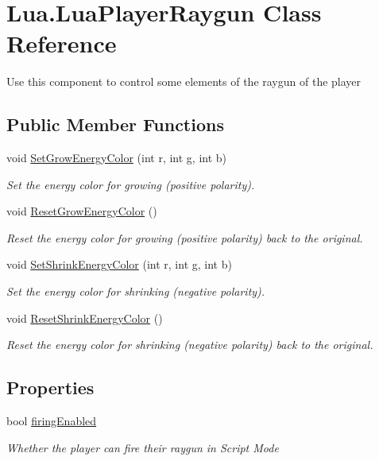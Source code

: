 \hypertarget{class_lua_1_1_lua_player_raygun}{}\section{Lua.\+Lua\+Player\+Raygun Class Reference}
\label{class_lua_1_1_lua_player_raygun}


Use this component to control some elements of the raygun of the player  


\subsection*{Public Member Functions}
\begin{DoxyCompactItemize}
\item 
void \mbox{\hyperlink{class_lua_1_1_lua_player_raygun_a6787608c1207618d069fba8aee7c8fff}{Set\+Grow\+Energy\+Color}} (int r, int g, int b)
\begin{DoxyCompactList}\small\item\em Set the energy color for growing (positive polarity). \end{DoxyCompactList}\item 
void \mbox{\hyperlink{class_lua_1_1_lua_player_raygun_aa7b98cc0da08ae879220e9729a47659e}{Reset\+Grow\+Energy\+Color}} ()
\begin{DoxyCompactList}\small\item\em Reset the energy color for growing (positive polarity) back to the original. \end{DoxyCompactList}\item 
void \mbox{\hyperlink{class_lua_1_1_lua_player_raygun_aad74166092a52e766a0296da4fabb98b}{Set\+Shrink\+Energy\+Color}} (int r, int g, int b)
\begin{DoxyCompactList}\small\item\em Set the energy color for shrinking (negative polarity). \end{DoxyCompactList}\item 
void \mbox{\hyperlink{class_lua_1_1_lua_player_raygun_a80852badcc3f3b0c14e73196b5299c37}{Reset\+Shrink\+Energy\+Color}} ()
\begin{DoxyCompactList}\small\item\em Reset the energy color for shrinking (negative polarity) back to the original. \end{DoxyCompactList}\end{DoxyCompactItemize}
\subsection*{Properties}
\begin{DoxyCompactItemize}
\item 
bool \mbox{\hyperlink{class_lua_1_1_lua_player_raygun_a002f731fc9b1c217a12b03045e87a0cd}{firing\+Enabled}}
\begin{DoxyCompactList}\small\item\em Whether the player can fire their raygun in Script Mode \end{DoxyCompactList}\end{DoxyCompactItemize}


